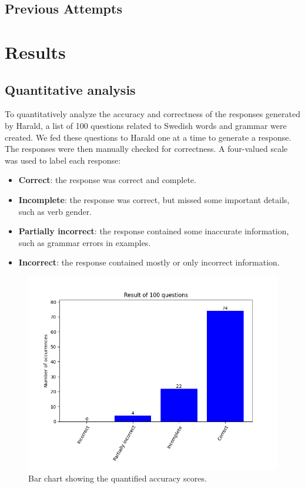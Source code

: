 \documentclass[a4paper,10pt]{article}
\begin{document}
\subsection{Previous Attempts}

\section{Results}

\subsection{Quantitative analysis}

To quantitatively analyze the accuracy and correctness of the responses generated by Harald, a list of 100 questions related to Swedish words and grammar were created. We fed these questions to Harald one at a time to generate a response. The responses were then manually checked for correctness. A four-valued scale was used to label each response:

\begin{itemize}
    \item \textbf{Correct}: the response was correct and complete.
    \item \textbf{Incomplete}: the response was correct, but missed some important details, such as verb gender.
    \item \textbf{Partially incorrect}: the response contained some inaccurate information, such as grammar errors in examples.
    \item \textbf{Incorrect}: the response contained mostly or only incorrect information.
\end{itemize}

\begin{figure}[htbp]
    \centering
    \includegraphics[width=0.8\linewidth]{quant_results.png} %
    \caption{Bar chart showing the quantified accuracy scores.}
    \label{fig:quant_results}
\end{figure}
\end{document}
